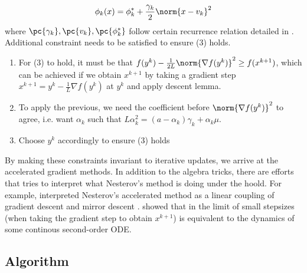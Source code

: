 \documentclass[11pt]{article}
\begin{document}
\[
    \phi_k(x)
        = \phi_k^* + \frac{\gamma_k}{2} \norm{x-v_k}^2    
\]
where $\pc{\gamma_k}, \pc{v_k}, \pc{\phi_k^*}$ follow certain recurrence relation detailed in \cite{nesterovIntroductoryLecturesConvex2004}. Additional constraint needs to be satisfied to ensure (3) holds. 
\begin{enumerate}
    \item For (3) to hold, it must be that $f(y^k) - \frac{1}{2L} \norm{\nabla f(y^k)}^2 \geq f(x^{k+1})$, which can be achieved if we obtain $x^{k+1}$ by taking a gradient step $x^{k+1} = y^k - \frac{1}{L} \nabla f(y^k)$ at $y^k$ and apply descent lemma.
    \item To apply the previous, we need the coefficient before $\norm{\nabla f(y^k)}^2$ to agree, i.e. want $\alpha_k$ such that $L\alpha_k^2 = (a-\alpha_k) \gamma_k + \alpha_k \mu$.
    \item Choose $y^k$ accordingly to ensure (3) holds
\end{enumerate}
By making these constraints invariant to iterative updates, we arrive at the accelerated gradient methods. In addition to the algebra tricks, there are efforts that tries to interpret what Nesterov's method is doing under the hoold. For example, \cite{allen-zhuLinearCouplingUltimate2016} interpreted Nesterov's accelerated method as a linear coupling of gradient descent and mirror descent . \cite{suDifferentialEquationModeling2015} showed that in the limit of small stepsizes (when taking the gradient step to obtain $x^{k+1}$) is equivalent to the dynamics of some continous second-order ODE.


\subsection{Algorithm}
\end{document}

